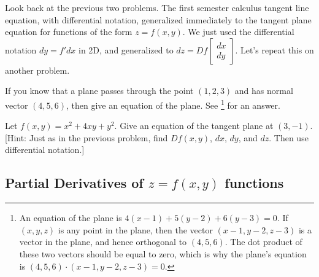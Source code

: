 Look back at the previous two problems.  The first semester calculus tangent line equation, with differential notation, generalized immediately to the tangent plane equation for functions of the form $z=f(x,y)$.  We just used the differential notation $dy=f'dx$ in 2D, and generalized to $dz = Df \begin{bmatrix}dx\\dy\end{bmatrix}$. Let's repeat this on another problem.
\begin{review*}
 If you know that a plane passes through the point $(1,2,3)$ and has normal vector $(4,5,6)$, then give an equation of the plane.  See \footnote{An equation of the plane is $4(x-1)+5(y-2)+6(y-3)=0$. If $(x,y,z)$ is any point in the plane, then the vector $(x-1,y-2,z-3)$ is a vector in the plane, and hence orthogonal to $(4,5,6)$. The dot product of these two vectors should be equal to zero, which is why the plane's equation is $(4,5,6)\cdot (x-1,y-2,z-3)=0$.} for an answer.
\end{review*}

\begin{problem}%
%
 Let $f(x,y)=x^2+4xy+y^2$. Give an equation of the tangent plane at $(3,-1)$.  [Hint: Just as in the previous problem, find $Df(x,y)$, $dx$, $dy$, and $dz$.  Then use differential notation.]
\end{problem}

\subsection{Partial Derivatives of $z=f(x,y)$ functions}

